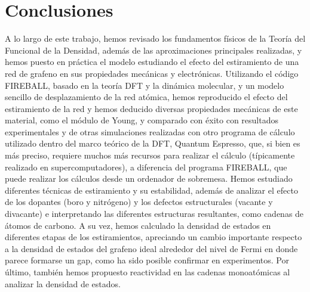 \newpage
\section{Conclusiones}

A lo largo de este trabajo, hemos revisado los fundamentos físicos de la Teoría del Funcional de la Densidad, además de las aproximaciones principales realizadas, y hemos puesto en práctica el modelo estudiando el efecto del estiramiento de una red de grafeno en sus propiedades mecánicas y electrónicas. Utilizando el código FIREBALL, basado en la teoría DFT y la dinámica molecular, y un modelo sencillo de desplazamiento de la red atómica, hemos reproducido el efecto del estiramiento de la red y hemos deducido diversas propiedades mecánicas de este material, como el módulo de Young, y comparado con éxito con resultados experimentales y de otras simulaciones realizadas con otro programa de cálculo utilizado dentro del marco teórico de la DFT, Quantum Espresso, que, si bien es más preciso, requiere muchos más recursos para realizar el cálculo (típicamente realizado en supercomputadores), a diferencia del programa FIREBALL, que puede realizar los cálculos desde un ordenador de sobremesa. Hemos estudiado diferentes técnicas de estiramiento y su estabilidad, además de analizar el efecto de los dopantes (boro y nitrógeno) y los defectos estructurales (vacante y divacante) e interpretando las diferentes estructuras resultantes, como cadenas de átomos de carbono. A su vez, hemos calculado la densidad de estados en diferentes etapas de los estiramientos, apreciando un cambio importante respecto a la densidad de estados del grafeno ideal alrededor del nivel de Fermi en donde parece formarse un gap, como ha sido posible confirmar en experimentos. Por último, también hemos propuesto reactividad en las cadenas monoatómicas al analizar la densidad de estados. \\


